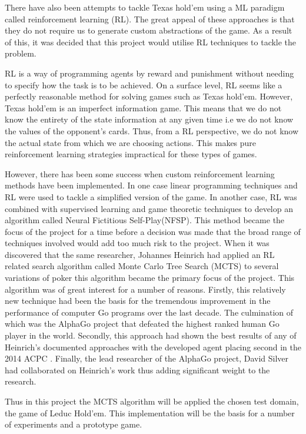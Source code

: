 There have also been attempts to tackle Texas hold'em using a ML paradigm called reinforcement
learning (RL).
The great appeal of these approaches is that they do not require us to generate custom abstractions of the game.
As a result of this, it was decided that this project would utilise RL techniques to tackle the problem.

RL is a way of programming agents by reward and punishment without needing to specify how the
task is to be achieved\citep{kaelbling1996reinforcement}.
On a surface level, RL seems like a perfectly reasonable method for solving games such as Texas hold'em.
However, Texas hold'em is an imperfect information game.
This means that we do not know the entirety of the state information at any given time
i.e we do not know the values of the opponent's cards.
Thus, from a RL perspective, we do not know the actual state from which we are choosing actions.
This makes pure reinforcement learning strategies impractical for these types of games.

However, there has been some success when custom reinforcement learning methods have been implemented.
In one case linear programming techniques and RL were used to tackle a
simplified version of the game\citep{dahl2001reinforcement}.
In another case, RL was combined with supervised learning and game theoretic
techniques\citep{heinrich2016deep} to develop an algorithm called Neural Fictitious Self-Play(NFSP).
This method became the focus of the project for a time before a decision was made
that the broad range of techniques involved would add too much risk to the project.
When it was discovered that the same researcher, Johannes Heinrich had applied an RL related search
algorithm called Monte Carlo Tree Search (MCTS) to several variations of poker\citep{heinrich2015smooth}
this algorithm became the primary focus of the project.
This algorithm was of great interest for a number of reasons.
Firstly, this relatively new technique had been the basis for the tremendous improvement in the
performance of computer Go programs over the last decade.
The culmination of which was the AlphaGo project that defeated the highest ranked human Go player in
the world\citep{silver2016mastering}.
Secondly, this approach had shown the best results of any of Heinrich's documented approaches
with the developed agent placing second in the 2014 ACPC .
Finally, the lead researcher of the AlphaGo project, David Silver had collaborated on Heinrich's
work thus adding significant weight to the research.

Thus in this project the MCTS algorithm will be applied the chosen test domain, the game of Leduc Hold'em.
This implementation will be the basis for a number of experiments and a prototype game.

